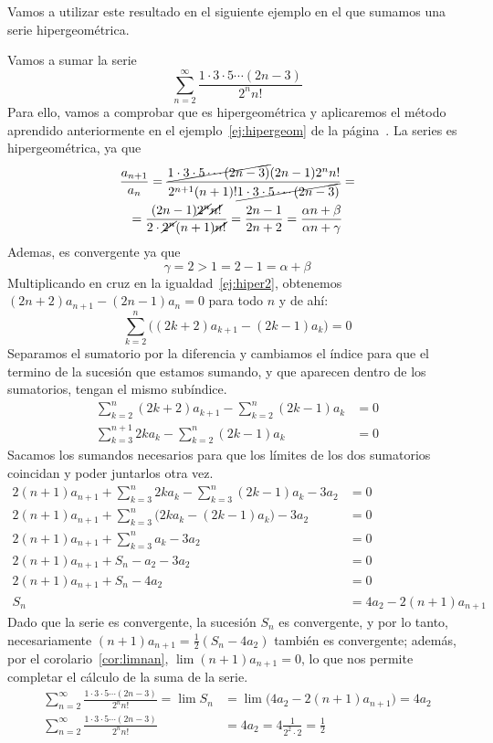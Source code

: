 Vamos a utilizar este resultado en el siguiente ejemplo en el que sumamos una serie hipergeométrica.
%
\begin{ejemplo}
Vamos a sumar la serie
\[
\displaystyle\sum_{n=2}^\infty   \frac{1\cdot 3\cdot 5\cdots (2n-3)}{2^nn!}
\]
Para ello, vamos a comprobar que es hipergeométrica y aplicaremos el método aprendido anteriormente en el ejemplo~\ref{ej:hipergeom} de la página~\pageref{ej:hipergeom}.
La series es hipergeométrica, ya que
\begin{multline}
\dfrac{a_{n+1}}{a_n}=
\frac{\cancel{1\cdot 3\cdot 5\cdots (2n-3)}(2n-1)2^{n}n!}{2^{n+1}(n+1)!\cancel{1\cdot 3\cdot 5\cdots (2n-3)}}=\\
=\frac{(2n-1)\cancel{2^{n}}\cancel{n!}}{2\cdot\cancel{2^{n}}(n+1)\cancel{n!}}
=\frac{2n-1}{2n+2}=\dfrac{\alpha n+\beta}{\alpha n+\gamma}\label{ej:hiper2}
\end{multline}
Ademas, es convergente ya que
\[
\gamma = 2 > 1= 2-1=\alpha+\beta
\]
Multiplicando en cruz en la igualdad~\eqref{ej:hiper2}, obtenemos  $(2n+2)a_{n+1}-(2n-1)a_n=0$ para todo $n$ y de ahí:
\[
\sum_{k=2}^n\big((2k+2)a_{k+1}-(2k-1)a_k\big)=0
\]
Separamos el sumatorio por la diferencia y cambiamos el índice para que el termino de la sucesión que estamos sumando, y que aparecen dentro de los sumatorios, tengan el mismo subíndice.
\begin{align*}
\sum_{k=2}^n(2k+2)a_{k+1}-\sum_{k=2}^n (2k-1)a_k&=0 \\
\sum_{k=3}^{n+1}2ka_{k}-\sum_{k=2}^n (2k-1)a_k&=0
\end{align*}
Sacamos los sumandos necesarios para que los límites de los dos sumatorios coincidan y poder juntarlos otra vez.
\begin{align*}
2(n+1)a_{n+1}+\sum_{k=3}^{n}2ka_{k}-\sum_{k=3}^n (2k-1)a_k -3a_2&=0 \\
2(n+1)a_{n+1}+\sum_{k=3}^{n}\big(2ka_{k}-(2k-1)a_k) -3a_2&=0 \\
2(n+1)a_{n+1}+\sum_{k=3}^{n}a_{k} -3a_2&=0 \\
2(n+1)a_{n+1}+S_n-a_2 -3a_2&=0 \\
2(n+1)a_{n+1}+S_n-4a_2&=0 \\
S_n&=4a_2-2(n+1)a_{n+1}
\end{align*}
Dado que la serie es convergente, la sucesión $S_n$ es convergente, y por lo tanto, necesariamente $(n+1)a_{n+1}=\frac12(S_n-4a_2)$ también es convergente;
además, por el corolario~\ref{cor:limnan}, $\lim (n+1)a_{n+1}=0$, lo que nos permite completar el cálculo de la suma de la serie.
%
\begin{align*}
\displaystyle\sum_{n=2}^\infty   \frac{1\cdot 3\cdot 5\cdots (2n-3)}{2^nn!} = \lim S_n & =
 \lim\big(4a_2-2(n+1)a_{n+1}\big) = 4a_2 \\
\displaystyle\sum_{n=2}^\infty   \frac{1\cdot 3\cdot 5\cdots (2n-3)}{2^nn!} & =
 4a_2=4\frac{1}{2^2\cdot 2}=\frac12\tag*{\fej}
 \end{align*}
\end{ejemplo}

